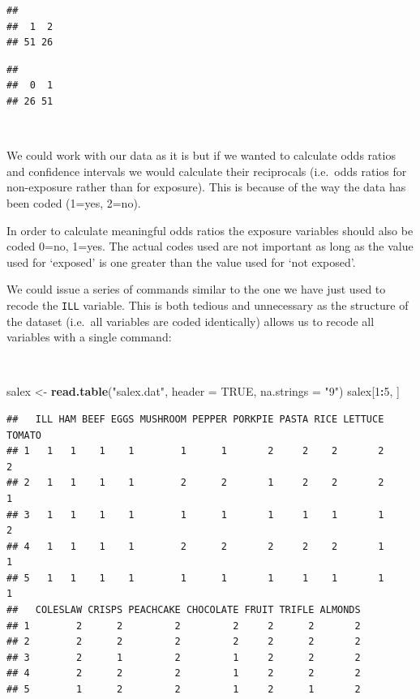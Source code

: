 \documentclass[12pt,a4paper]{book}
\newenvironment{Shaded}{\begin{snugshade}}{\end{snugshade}}
\newcommand{\DataTypeTok}[1]{\textcolor[rgb]{0.13,0.29,0.53}{#1}}
\newcommand{\DecValTok}[1]{\textcolor[rgb]{0.00,0.00,0.81}{#1}}
\newcommand{\KeywordTok}[1]{\textcolor[rgb]{0.13,0.29,0.53}{\textbf{#1}}}
\newcommand{\NormalTok}[1]{#1}
\newcommand{\OperatorTok}[1]{\textcolor[rgb]{0.81,0.36,0.00}{\textbf{#1}}}
\newcommand{\OtherTok}[1]{\textcolor[rgb]{0.56,0.35,0.01}{#1}}
\newcommand{\StringTok}[1]{\textcolor[rgb]{0.31,0.60,0.02}{#1}}
\theoremstyle{definition}
\theoremstyle{definition}
\theoremstyle{definition}
\theoremstyle{remark}
\begin{document}
\begin{verbatim}
## 
##  1  2 
## 51 26
\end{verbatim}

\begin{verbatim}
## 
##  0  1 
## 26 51
\end{verbatim}

~

We could work with our data as it is but if we wanted to calculate odds
ratios and confidence intervals we would calculate their reciprocals
(i.e.~odds ratios for non-exposure rather than for exposure). This is
because of the way the data has been coded (1=yes, 2=no).

In order to calculate meaningful odds ratios the exposure variables
should also be coded 0=no, 1=yes. The actual codes used are not
important as long as the value used for `exposed' is one greater than
the value used for `not exposed'.

We could issue a series of commands similar to the one we have just used
to recode the \texttt{ILL} variable. This is both tedious and
unnecessary as the structure of the dataset (i.e.~all variables are
coded identically) allows us to recode all variables with a single
command:

~

\begin{Shaded}
\begin{Highlighting}[]
\NormalTok{salex <-}\StringTok{ }\KeywordTok{read.table}\NormalTok{(}\StringTok{"salex.dat"}\NormalTok{, }\DataTypeTok{header =} \OtherTok{TRUE}\NormalTok{, }\DataTypeTok{na.strings =} \StringTok{"9"}\NormalTok{)}
\NormalTok{salex[}\DecValTok{1}\OperatorTok{:}\DecValTok{5}\NormalTok{, ]}
\end{Highlighting}
\end{Shaded}

\begin{verbatim}
##   ILL HAM BEEF EGGS MUSHROOM PEPPER PORKPIE PASTA RICE LETTUCE TOMATO
## 1   1   1    1    1        1      1       2     2    2       2      2
## 2   1   1    1    1        2      2       1     2    2       2      1
## 3   1   1    1    1        1      1       1     1    1       1      2
## 4   1   1    1    1        2      2       2     2    2       1      1
## 5   1   1    1    1        1      1       1     1    1       1      1
##   COLESLAW CRISPS PEACHCAKE CHOCOLATE FRUIT TRIFLE ALMONDS
## 1        2      2         2         2     2      2       2
## 2        2      2         2         2     2      2       2
## 3        2      1         2         1     2      2       2
## 4        2      2         2         1     2      2       2
## 5        1      2         2         1     2      1       2
\end{verbatim}
\end{document}
